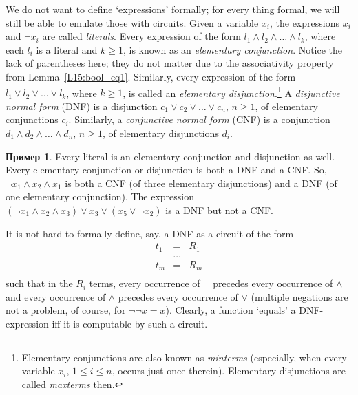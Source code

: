 \documentclass[12pt,notitlepage]{article}
\theoremstyle{plain}
\theoremstyle{definition}
\newtheorem{exm}[thm]{Пример}
\theoremstyle{plain}
\newcommand{\1}{\mathbf{1}}
\newcommand{\0}{\mathbf{0}}
\begin{document}
We do not want to define `expressions' formally; for every thing formal, we will still be able to emulate those with circuits. Given a variable $x_i$, the expressions $x_i$ and $\neg x_i$ are called \emph{literals}. Every expression of the form $l_1 \wedge l_2 \wedge \ldots \wedge l_k$, where each $l_i$ is a literal and $k \ge 1$, is known as an \emph{elementary conjunction}. Notice the lack of parentheses here; they do not matter due to the associativity property from Lemma~\ref{L15:bool_eq1}. Similarly, every expression of the form $l_1 \vee l_2 \vee \ldots \vee l_k$, where $k \ge 1$, is called an \emph{elementary disjunction}.\footnote{Elementary conjunctions are also known as \emph{minterms} (especially, when every variable $x_i$, $1 \leq i \leq n$, occurs just once therein). Elementary disjunctions are called \emph{maxterms} then.} A \emph{disjunctive normal form} (DNF) is a disjunction $c_1 \vee c_2 \vee \ldots \vee c_n$, $n \geq 1$, of elementary conjunctions $c_i$. Similarly, a \emph{conjunctive normal form} (CNF) is a conjunction $d_1 \wedge d_2 \wedge \ldots \wedge d_n$, $n \geq 1$, of elementary disjunctions $d_i$.

\begin{exm}
	Every literal is an elementary conjunction and disjunction as well. Every elementary conjunction or disjunction is both a DNF and a CNF. So, $\neg x_1 \wedge x_2 \wedge x_1$ is both a CNF (of three elementary disjunctions) and a DNF (of one elementary conjunction). The expression $(\neg x_1 \wedge x_2 \wedge x_3) \vee x_3 \vee (x_5 \vee \neg x_2)$ is a DNF but not a CNF.
\end{exm}

It is not hard to formally define, say, a DNF as a circuit of the form 
$$
\begin{array}{rcl}
	t_1 &=& R_1\\
	&\ldots&\\
	t_m &=& R_m\\
\end{array}
$$
such that in the $R_i$ terms, every occurrence of $\neg$ precedes every occurrence of $\wedge$ and every occurrence of $\wedge$ precedes every occurrence of $\vee$ (multiple negations are not a problem, of course, for $\neg \neg x = x$). Clearly, a function `equals' a DNF-expression iff it is computable by such a circuit. 
\end{document}
